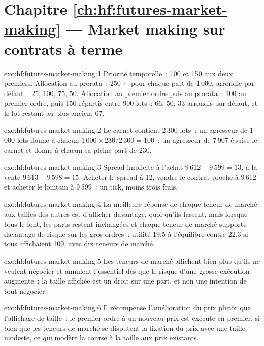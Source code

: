 \section*{Chapitre \ref{ch:hf:futures-market-making} --- Market making sur contrats à terme}

\begin{solution}{exo:hf:futures-market-making:1}
Priorité temporelle~: 100 et 150 aux deux premiers. Allocation au prorata~: $250\times$ pour chaque part de 1\,000, arrondie par défaut~: 25, 100, 75, 50. Allocation au premier ordre puis au prorata~: 100
au premier ordre, puis 150 répartis entre 900 lots~: 66, 50, 33 arrondis par défaut, et le lot restant au plus ancien, 67.
\end{solution}

\begin{solution}{exo:hf:futures-market-making:2}
Le carnet contient 2\,300 lots~: un agresseur de 1\,000 lots donne à chacun $1\,000\times230/2\,300=100$~; un agresseur de 7\,907 épuise le carnet et donne à chacun
sa pleine part de 230.
\end{solution}

\begin{solution}{exo:hf:futures-market-making:3}
Spread implicite à l'achat $9\,612-9\,599=13$, à la vente $9\,613-9\,598=15$. Acheter le spread à 12, vendre le contrat proche à 9\,612 et acheter le lointain à 9\,599~:
un tick, moins trois frais.
\end{solution}

\begin{solution}{exo:hf:futures-market-making:4}
La meilleure réponse de chaque teneur de marché aux tailles des autres est d'afficher davantage, quoi qu'ils fassent, mais lorsque tous le font, les parts restent inchangées et chaque teneur de marché supporte
davantage de risque sur les gros ordres~: utilité 19.5 à l'équilibre contre 22.3 si tous affichaient 100, avec dix teneurs de marché.
\end{solution}

\begin{solution}{exo:hf:futures-market-making:5}
Les teneurs de marché affichent bien plus qu'ils ne veulent négocier et annulent l'essentiel dès que le risque d'une grosse exécution augmente~; la taille affichée est un droit sur une part,
et non une intention de tout négocier.
\end{solution}

\begin{solution}{exo:hf:futures-market-making:6}
Il récompense l'amélioration du prix plutôt que l'affichage de taille~: le premier ordre à un nouveau prix est exécuté en premier, si bien que les teneurs de marché se disputent la fixation du prix avec
une taille modeste, ce qui modère la course à la taille aux prix existants.
\end{solution}


